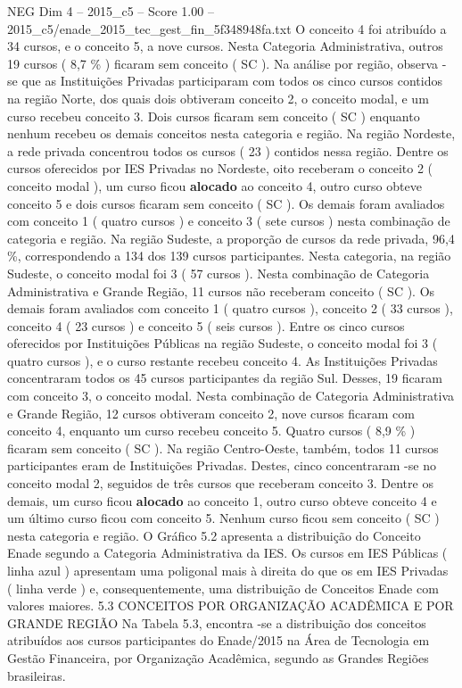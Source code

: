 \begin{textsample}{NEG Dim 4 – 2015\_c5 – Score 1.00 – 2015\_c5/enade\_2015\_tec\_gest\_fin\_5f348948fa.txt}
O conceito 4 foi atribuído a 34 cursos, e o conceito 5, a nove cursos.
Nesta Categoria Administrativa, outros 19 cursos ( 8,7 \% ) ficaram sem conceito ( SC ).
Na análise por região, observa -se que as Instituições Privadas participaram com todos os cinco cursos contidos na região Norte, dos quais dois obtiveram conceito 2, o conceito modal, e um curso recebeu conceito 3.
Dois cursos ficaram sem conceito ( SC ) enquanto nenhum recebeu os demais conceitos nesta categoria e região.
Na região Nordeste, a rede privada concentrou todos os cursos ( 23 ) contidos nessa região.
Dentre os cursos oferecidos por IES Privadas no Nordeste, oito receberam o conceito 2 ( conceito modal ), um curso ficou \textbf{alocado} ao conceito 4, outro curso obteve conceito 5 e dois cursos ficaram sem conceito ( SC ).
Os demais foram avaliados com conceito 1 ( quatro cursos ) e conceito 3 ( sete cursos ) nesta combinação de categoria e região.
Na região Sudeste, a proporção de cursos da rede privada, 96,4 \%, correspondendo a 134 dos 139 cursos participantes.
Nesta categoria, na região Sudeste, o conceito modal foi 3 ( 57 cursos ).
Nesta combinação de Categoria Administrativa e Grande Região, 11 cursos não receberam conceito ( SC ).
Os demais foram avaliados com conceito 1 ( quatro cursos ), conceito 2 ( 33 cursos ), conceito 4 ( 23 cursos ) e conceito 5 ( seis cursos ).
Entre os cinco cursos oferecidos por Instituições Públicas na região Sudeste, o conceito modal foi 3 ( quatro cursos ), e o curso restante recebeu conceito 4.
As Instituições Privadas concentraram todos os 45 cursos participantes da região Sul.
Desses, 19 ficaram com conceito 3, o conceito modal.
Nesta combinação de Categoria Administrativa e Grande Região, 12 cursos obtiveram conceito 2, nove cursos ficaram com conceito 4, enquanto um curso recebeu conceito 5.
Quatro cursos ( 8,9 \% ) ficaram sem conceito ( SC ).
Na região Centro-Oeste, também, todos 11 cursos participantes eram de Instituições Privadas.
Destes, cinco concentraram -se no conceito modal 2, seguidos de três cursos que receberam conceito 3.
Dentre os demais, um curso ficou \textbf{alocado} ao conceito 1, outro curso obteve conceito 4 e um último curso ficou com conceito 5.
Nenhum curso ficou sem conceito ( SC ) nesta categoria e região.
O Gráfico 5.2 apresenta a distribuição do Conceito Enade segundo a Categoria Administrativa da IES.
Os cursos em IES Públicas ( linha azul ) apresentam uma poligonal mais à direita do que os em IES Privadas ( linha verde ) e, consequentemente, uma distribuição de Conceitos Enade com valores maiores. 5.3 CONCEITOS POR ORGANIZAÇÃO ACADÊMICA E POR GRANDE REGIÃO Na Tabela 5.3, encontra -se a distribuição dos conceitos atribuídos aos cursos participantes do Enade/2015 na Área de Tecnologia em Gestão Financeira, por Organização Acadêmica, segundo as Grandes Regiões brasileiras.

\end{textsample}
